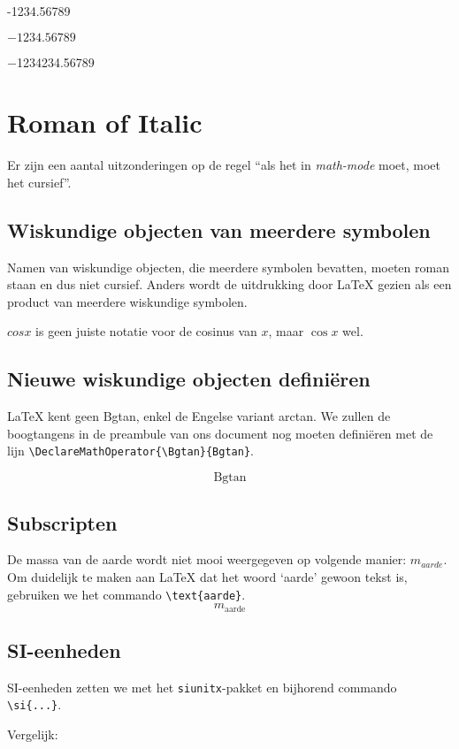 \documentclass{article}
\DeclareMathOperator{\Bgtan}{Bgtan}
\begin{document}
	-1234.56789
	
	\(-1234.56789\)
	
	\num{-1234234.56789}
	
	\section{Roman of Italic}
	
	Er zijn een aantal uitzonderingen op de regel ``als het in \textit{math-mode} moet, moet het cursief''. 
	
	\subsection{Wiskundige objecten van meerdere symbolen}
	
	Namen van wiskundige objecten, die meerdere symbolen bevatten, moeten roman staan en dus niet cursief. Anders wordt de uitdrukking door \LaTeX{} gezien als een product van meerdere wiskundige symbolen.
	
	\(cos x\) is geen juiste notatie voor de cosinus van \(x\), maar \(\cos x\) wel.
	
	\subsection{Nieuwe wiskundige objecten definiëren}
	
	\LaTeX{} kent geen Bgtan, enkel de Engelse variant arctan. We zullen de boogtangens in de preambule van ons document nog moeten definiëren met de lijn \verb*|\DeclareMathOperator{\Bgtan}{Bgtan}|.
	
	\[\Bgtan\]
	
	\subsection{Subscripten}
	
	De massa van de aarde wordt niet mooi weergegeven op volgende manier: \(m_{aarde}\). Om duidelijk te maken aan \LaTeX{} dat het woord `aarde' gewoon tekst is, gebruiken we het commando \verb*|\text{aarde}|.
	\[m_\text{aarde}\]
	
	\subsection{SI-eenheden}
	
	SI-eenheden zetten we met het \texttt{siunitx}-pakket en bijhorend commando \verb*|\si{...}|.
	
	Vergelijk:
	
\end{document}
